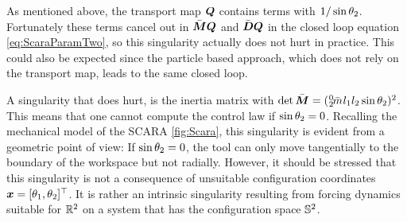 As mentioned above, the transport map $\sysTransportMap$ contains terms with $\sfrac{1}{\sin\jointAngle[2]}$. 
Fortunately these terms cancel out in $\sysInertiaMatC\sysTransportMap$ and $\sysDissMatC\sysTransportMap$ in the closed loop equation \eqref{eq:ScaraParamTwo}, so this singularity actually does not hurt in practice.
This could also be expected since the particle based approach, which does not rely on the transport map, leads to the same closed loop.

A singularity that does hurt, is the inertia matrix with $\det\sysInertiaMatC = (\bodyMassC{0}{2} l_1 l_2 \sin\jointAngle[2])^2$.
This means that one cannot compute the control law if $\sin\jointAngle[2] = 0$.
Recalling the mechanical model of the SCARA \autoref{fig:Scara}, this singularity is evident from a geometric point of view:
If $\sin\jointAngle[2] = 0$, the tool can only move tangentially to the boundary of the workspace but not radially.
However, it should be stressed that this singularity is not a consequence of unsuitable configuration coordinates $\sysCoord = [\jointAngle[1], \jointAngle[2]]^\top$.
It is rather an intrinsic singularity resulting from forcing dynamics suitable for $\RealNum^2$ on a system that has the configuration space $\Sphere^2$.
 


